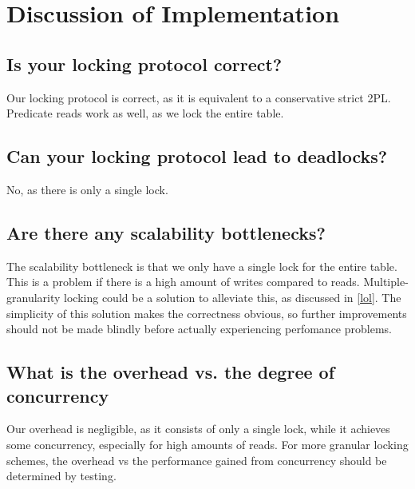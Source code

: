 \documentclass[11pt,a4paper]{article}
\begin{document}
\section{Discussion of Implementation}
\subsection{Is your locking protocol correct?}
Our locking protocol is correct, as it is equivalent to a conservative strict
2PL. Predicate reads work as well, as we lock the entire table.

\subsection{Can your locking protocol lead to deadlocks?}
No, as there is only a single lock.

\subsection{Are there any scalability bottlenecks?}
The scalability bottleneck is that we only have a single lock for the entire
table. This is a problem if there is a high amount of writes compared to
reads. Multiple-granularity locking could be a solution to alleviate this,
as discussed in \autoref{lol}. The simplicity of this solution makes the
correctness obvious, so further improvements should not be made blindly before
actually experiencing perfomance problems.

\subsection{What is the overhead vs. the degree of concurrency}
Our overhead is negligible, as it consists of only a single lock, while
it achieves some concurrency, especially for high amounts of reads. For
more granular locking schemes, the overhead vs the performance gained from
concurrency should be determined by testing.
\end{document}

